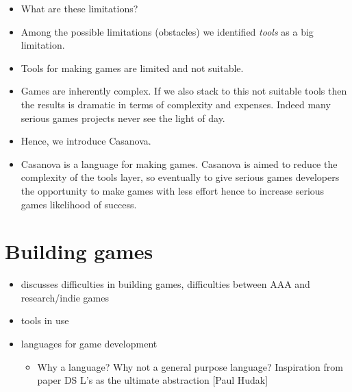 \documentclass[10pt,a4paper]{book}
\begin{document}
\begin{itemize}
\item What are these limitations?\\
\item Among the possible limitations (obstacles) we identified \textit{tools} as a big limitation.\\
\item Tools for making games are limited and not suitable.\\
\item Games are inherently complex. If we also stack to this not suitable tools then the results is dramatic in terms of complexity and expenses. Indeed many serious games projects never see the light of day.\\
\item Hence, we introduce Casanova.\\
\item Casanova is a language for making games. Casanova is aimed to reduce the complexity of the tools layer, so eventually to give serious games developers the opportunity to make games with less effort hence to increase serious games likelihood of success.

\end{itemize}


\section{Building games}
\begin{itemize}
\item discusses difficulties in building games, difficulties between AAA and research/indie games
\item tools in use
\item languages for game development
\begin{itemize}
\item Why a language? Why not a general purpose language? Inspiration from paper DS L's as  the ultimate abstraction [Paul Hudak]
\end{itemize}
\end{itemize}
\end{document}

